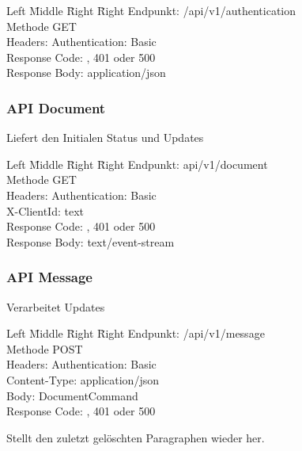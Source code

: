 \begin{tabbing}
Left \= Middle \= Right \= Right \kill
Endpunkt:  \> \> \> /api/v1/authentication\\
Methode \>  \> \> GET\\
Headers:  \> \>   \> Authentication: Basic \\
Response Code:  \> \>  , 401 oder 500 \\
Response Body:  \> \>  \> application/json \\
\end{tabbing}

\subsubsection{API Document}

Liefert den Initialen Status und Updates

\begin{tabbing}
    Left \= Middle \= Right \= Right \kill
    Endpunkt:  \> \> \> api/v1/document\\
    Methode \>  \> \> GET\\
    Headers:  \> \>   \> Authentication: Basic\\
    \> \>   \> X-ClientId: text\\
    Response Code:  \> \>  , 401 oder 500 \\
    Response Body:  \> \>  \> text/event-stream \\
\end{tabbing}


\subsubsection{API Message}

Verarbeitet Updates

\begin{tabbing}
    Left \= Middle \= Right \= Right \kill
    Endpunkt:  \> \> \> /api/v1/message\\
    Methode \>  \> \> POST\\
    Headers:  \> \>   \> Authentication: Basic\\
    \> \>   \> Content-Type: application/json\\
    Body:  \> \>  \> DocumentCommand\\
    Response Code:  \> \>  , 401 oder 500 \\
\end{tabbing}

Stellt den zuletzt gelöschten Paragraphen wieder her.


